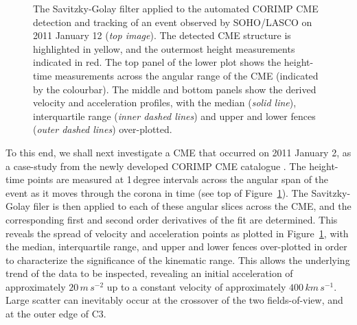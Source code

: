 \documentclass[structabstract]{aa}
\begin{document}
\begin{figure}[!t]
\caption{The Savitzky-Golay filter applied to the automated CORIMP CME detection and tracking of an event observed by SOHO/LASCO on 2011 January 12 (\emph{top image}). The detected CME structure is highlighted in yellow, and the outermost height measurements indicated in red. The top panel of the lower plot shows the height-time measurements across the angular range of the CME (indicated by the colourbar). The middle and bottom panels show the derived velocity and acceleration profiles, with the median (\emph{solid line}), interquartile range (\emph{inner dashed lines}) and upper and lower fences (\emph{outer dashed lines}) over-plotted.}
\label{fig_savgol_CME_CORIMP}
\end{figure}



To this end, we shall next investigate a CME that occurred on 2011 January 2, as a case-study from the newly developed CORIMP CME catalogue \citep{2012ApJ...752..144M, 2012ApJ...752..145B}. The height-time points are measured at 1\,degree intervals across the angular span of the event as it moves through the corona in time (see top of Figure~\ref{fig_savgol_CME_CORIMP}). The Savitzky-Golay filer is then applied to each of these angular slices across the CME, and the corresponding first and second order derivatives of the fit are determined. This reveals the spread of velocity and acceleration points as plotted in Figure~\ref{fig_savgol_CME_CORIMP}, with the median, interquartile range, and upper and lower fences over-plotted in order to characterize the significance of the kinematic range. This allows the underlying trend of the data to be inspected, revealing an initial acceleration of approximately $20\,m\,s^{-2}$ up to a constant velocity of approximately $400\,km\,s^{-1}$. Large scatter can inevitably occur at the crossover of the two fields-of-view, and at the outer edge of C3.
\end{document}
